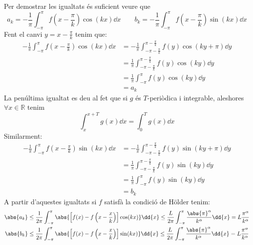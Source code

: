 \documentclass[10pt,a4paper]{article}
\newcommand{\RR}{\ensuremath{\mathbb{R}}} %
\theoremstyle{definition}
\begin{document}
\begin{enumerate}
        Per demostrar les igualtats és suficient veure que $$a_k=-\frac{1}{\pi}\int_{-\pi}^\pi f\left(x-\frac{\pi}{k}\right)\cos(kx)\dd{x}\qquad b_k=-\frac{1}{\pi}\int_{-\pi}^\pi f\left(x-\frac{\pi}{k}\right)\sin(kx)\dd{x}$$
        Fent el canvi $y=x-\frac{\pi}{k}$ tenim que:
        \begin{align*}
          -\frac{1}{\pi}\int_{-\pi}^\pi f\left(x-\frac{\pi}{k}\right)\cos(kx)\dd{x} & = -\frac{1}{\pi}\int_{-\pi-\frac{\pi}{k}}^{\pi-\frac{\pi}{k}} f(y)\cos(ky+\pi)\dd{y} \\
                                                                                    & =\frac{1}{\pi}\int_{-\pi-\frac{\pi}{k}}^{\pi-\frac{\pi}{k}} f(y)\cos(ky)\dd{y}       \\
                                                                                    & =\frac{1}{\pi}\int_{-\pi}^{\pi} f(y)\cos(ky)\dd{y}                                   \\
                                                                                    & =a_k
        \end{align*}
        La penúltima igualtat es deu al fet que si $g$ és $T$-periòdica i integrable, aleshores $\forall x\in\RR$ tenim $$\int_x^{x+T}g(x)\dd{x}=\int_0^{T}g(x)\dd{x}$$
        Similarment:
        \begin{align*}
          -\frac{1}{\pi}\int_{-\pi}^\pi f\left(x-\frac{\pi}{k}\right)\sin(kx)\dd{x} & = -\frac{1}{\pi}\int_{-\pi-\frac{\pi}{k}}^{\pi-\frac{\pi}{k}} f(y)\sin(ky+\pi)\dd{y} \\
                                                                                    & =\frac{1}{\pi}\int_{-\pi-\frac{\pi}{k}}^{\pi-\frac{\pi}{k}} f(y)\sin(ky)\dd{y}       \\
                                                                                    & =\frac{1}{\pi}\int_{-\pi}^{\pi} f(y)\sin(ky)\dd{y}                                   \\
                                                                                    & =b_k
        \end{align*}
        A partir d'aquestes igualtats si $f$ satisfà la condició de Hölder tenim:
        \begin{align*}
          \abs{a_k} & \leq\frac{1}{2\pi}\int_{-\pi}^\pi\abs{\left[f(x)-f\left(x-\frac{x}{k}\right)\right]\cos(kx)}\dd{x}\leq \frac{L}{2\pi}\int_{-\pi}^\pi\frac{\abs{\pi}^\alpha}{k^\alpha}\dd{x}= L\frac{\pi^\alpha}{k^\alpha} \\
          \abs{b_k} & \leq\frac{1}{2\pi}\int_{-\pi}^\pi\abs{\left[f(x)-f\left(x-\frac{x}{k}\right)\right]\sin(kx)}\dd{x}\leq \frac{L}{2\pi}\int_{-\pi}^\pi\frac{\abs{\pi}^\alpha}{k^\alpha}\dd{x}=L\frac{\pi^\alpha}{k^\alpha}  \\
        \end{align*}
\end{enumerate}
\end{document}
